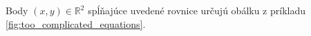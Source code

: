 Body $(x,y)\in \mathbb{R}^2$ spĺňajúce uvedené rovnice určujú obálku z príkladu \ref{fig:too_complicated_equations}.


 